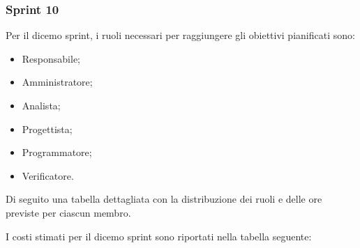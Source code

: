 

\pagebreak
\subsubsection{Sprint 10}

Per il dicemo sprint, i ruoli necessari per raggiungere gli obiettivi
pianificati sono:
\begin{itemize}
    \item Responsabile;
    \item Amministratore;
    \item Analista;
    \item Progettista;
    \item Programmatore;
    \item Verificatore.
\end{itemize}

Di seguito una tabella dettagliata con la distribuzione dei ruoli e delle ore previste per ciascun membro.



I costi stimati per il dicemo sprint sono riportati nella tabella seguente:

